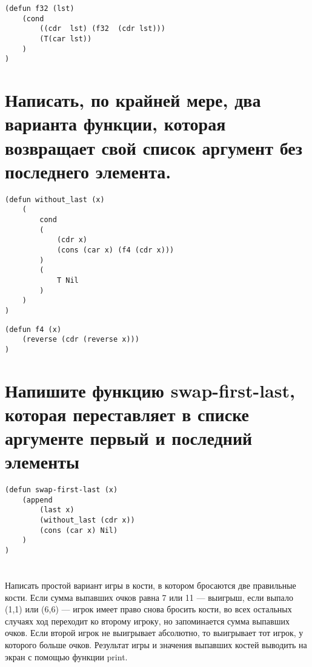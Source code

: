 \documentclass[a4paper, 14pt, unknownkeysallowed]{extreport}
\begin{document}
\begin{lstlisting}
(defun f32 (lst)
	(cond
		((cdr  lst) (f32  (cdr lst)))
		(T(car lst))
	)
)
\end{lstlisting}

\section{Написать, по крайней мере, два варианта функции, которая возвращает
	свой список аргумент без последнего элемента. }

\begin{lstlisting}
(defun without_last (x)
	(
		cond 
		(
			(cdr x) 
			(cons (car x) (f4 (cdr x)))
		)
		(
			T Nil
		)
	)
)
\end{lstlisting}

\begin{lstlisting}
(defun f4 (x)
	(reverse (cdr (reverse x)))
)
\end{lstlisting}

\section{Напишите функцию swap-first-last, которая переставляет в списке аргументе первый и последний элементы}

\begin{lstlisting}
(defun swap-first-last (x)
	(append 
		(last x)
		(without_last (cdr x))
		(cons (car x) Nil)
	)
)
\end{lstlisting}


\section{}
Написать простой вариант игры в кости, в котором бросаются две
правильные кости. Если сумма выпавших очков равна 7 или 11 —
выигрыш, если выпало (1,1) или (6,6) — игрок имеет право снова
бросить кости, во всех остальных случаях ход переходит ко второму
игроку, но запоминается сумма выпавших очков. Если второй игрок не
выигрывает абсолютно, то выигрывает тот игрок, у которого больше
очков. Результат игры и значения выпавших костей выводить на экран с помощью функции print. 
\end{document}
